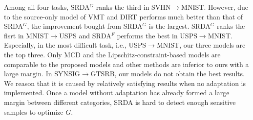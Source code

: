 \documentclass[journal,twocolumn]{IEEEtran}
\theoremstyle{definition}
\begin{document}
Among all four tasks, SRDA$^G$ ranks the third in SVHN$\rightarrow$MNIST. However, due to the source-only model of VMT and DIRT performs much better than that of SRDA$^G$, the improvement bought from SRDA$^G$ is the largest.  SRDA$^G$ ranks the fisrt in MNIST$\rightarrow$USPS and SRDA$^F$ performs the best in USPS$\rightarrow$MNIST. Especially, in the most difficult task, i.e., USPS$\rightarrow$MNIST, our three models are the top three. Only MCD and the Lipschitz-constraint-based models are comparable to the proposed models and other methods are inferior to ours with a large margin. In SYNSIG$\rightarrow$GTSRB, our models do not obtain the best results. We reason that it is caused by relatively satisfying results when no adaptation is implemented. Once a model without adaptation has already formed a large margin between different categories, SRDA is hard to detect enough sensitive samples to optimize $G$.
\end{document}
